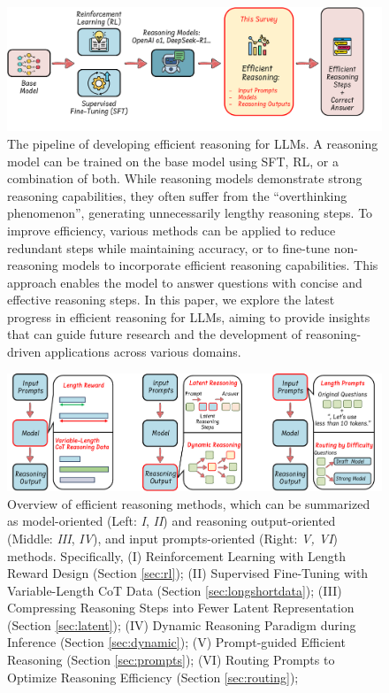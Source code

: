 \documentclass{article}
\begin{document}
%     

\begin{figure}[h]
    \centering
    \includegraphics[width=\linewidth]{figs/pipeline.pdf}
    \caption{The pipeline of developing efficient reasoning for LLMs. A reasoning model can be trained on the base model using SFT, RL, or a combination of both. While reasoning models demonstrate strong reasoning capabilities, they often suffer from the ``overthinking phenomenon'', generating unnecessarily lengthy reasoning steps. To improve efficiency, various methods can be applied to reduce redundant steps while maintaining accuracy, or to fine-tune non-reasoning models to incorporate efficient reasoning capabilities. This approach enables the model to answer questions with concise and effective reasoning steps. In this paper, we explore the latest progress in efficient reasoning for LLMs, aiming to provide insights that can guide future research and the development of reasoning-driven applications across various domains.}
    \label{fig:pipeline}
\end{figure}




\begin{figure}[t]
    \centering
    \includegraphics[width=\linewidth]{figs/overview.pdf}
    \vspace{2mm}
    \caption{
    Overview of efficient reasoning methods, which can be summarized as model-oriented (Left: \textit{I}, \textit{II}) and reasoning output-oriented (Middle: \textit{III}, \textit{IV}), and input prompts-oriented (Right: \textit{V, VI}) methods. Specifically, (I) Reinforcement Learning with Length Reward Design (Section \ref{sec:rl}); (II) Supervised Fine-Tuning with Variable-Length CoT Data (Section \ref{sec:longshortdata}); (III) Compressing Reasoning Steps into Fewer Latent Representation (Section \ref{sec:latent}); (IV) Dynamic Reasoning Paradigm during Inference (Section \ref{sec:dynamic}); (V) Prompt-guided Efficient Reasoning (Section \ref{sec:prompts}); (VI) Routing Prompts to Optimize Reasoning Efficiency (Section \ref{sec:routing}); }

    \label{fig:overview}
\end{figure}
\end{document}
